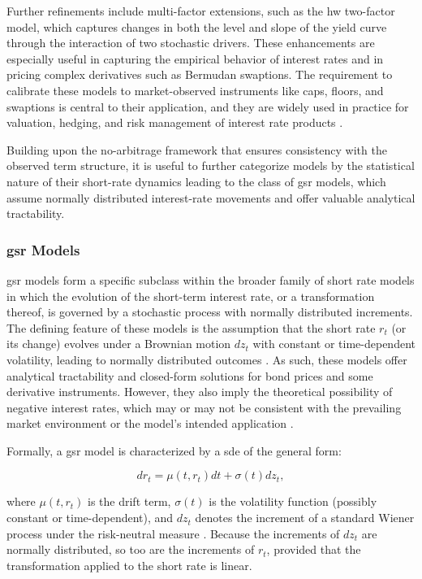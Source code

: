 Further refinements include multi-factor extensions, such as the \ac{hw} two-factor model, which captures changes in both the level and slope of the yield curve through the interaction of two stochastic drivers. These enhancements are especially useful in capturing the empirical behavior of interest rates and in pricing complex derivatives such as Bermudan swaptions. The requirement to calibrate these models to market-observed instruments like caps, floors, and swaptions is central to their application, and they are widely used in practice for valuation, hedging, and risk management of interest rate products \parencite[p.~719]{hull2015optionsfutures}.

Building upon the no-arbitrage framework that ensures consistency with the observed term structure, it is useful to further categorize models by the statistical nature of their short-rate dynamics leading to the class of \ac{gsr} models, which assume normally distributed interest-rate movements and offer valuable analytical tractability.

\subsubsection{\ac{gsr} Models} \label{gaussian_short_rate_models}
\ac{gsr} models form a specific subclass within the broader family of short rate models in which the evolution of the short-term interest rate, or a transformation thereof, is governed by a stochastic process with normally distributed increments. The defining feature of these models is the assumption that the short rate $r_t$ (or its change) evolves under a Brownian motion $dz_t$ with constant or time-dependent volatility, leading to normally distributed outcomes \parencite[p.~53]{brigo2006interest}. As such, these models offer analytical tractability and closed-form solutions for bond prices and some derivative instruments. However, they also imply the theoretical possibility of negative interest rates, which may or may not be consistent with the prevailing market environment or the model's intended application \parencite[pp.~719--720]{hull2015optionsfutures}.

Formally, a \ac{gsr} model is characterized by a \ac{sde}  of the general form:

\begin{equation}
	dr_t = \mu(t, r_t) dt + \sigma(t) dz_t,
\end{equation}

where $\mu(t, r_t)$ is the drift term, $\sigma(t)$ is the volatility function (possibly constant or time-dependent), and $dz_t$ denotes the increment of a standard Wiener process under the risk-neutral measure \parencite[p.~53]{brigo2006interest}. Because the increments of $dz_t$ are normally distributed, so too are the increments of $r_t$, provided that the transformation applied to the short rate is linear.

